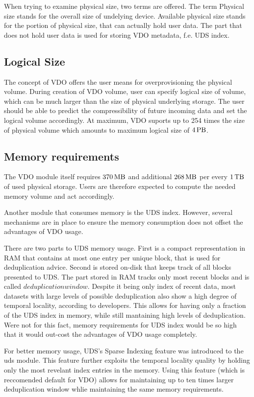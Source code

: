 \documentclass[
  color, %
  table, %
  lof,   %
  lot,   %
]{fithesis3}
\begin{document}
When trying to examine physical size, two terms are offered. The term Physical size stands for the overall size of undelying device. Available physical size stands for the portion of physical size, that can actually hold user data. The part that does not hold user data is used for storing VDO metadata, f.e. UDS index.

\subsection{Logical Size}
The concept of VDO offers the user means for overprovisioning the physical volume. During creation of VDO volume, user can specify logical size of volume, which can be much larger than the size of physical underlying storage. The user should be able to predict the compressibility of future incoming data and set the logical volume accordingly. At maximum, VDO suports up to 254 times the size of physical volume which amounts to maximum logical size of $\SI{4}{\peta\byte}$.

\subsection{Memory requirements}
The VDO module itself requires $\SI{370}{\mega\byte}$ and additional $\SI{268}{\mega\byte}$ per every $\SI{1}{\tera\byte}$ of used physical storage. Users are therefore expected to compute the needed memory volume and act accordingly.

Another module that consumes memory is the UDS index. However, several mechanisms are in place to ensure the memory consumption does not offset the advantages of VDO usage.

There are two parts to UDS memory usage. First is a compact representation in RAM that contains at most one entry per unique block, that is used for deduplication advice. Second is stored on-disk that keeps track of all blocks presented to UDS. The part stored in RAM tracks only most recent blocks and is called $deduplication window$. Despite it being only index of recent data, most datasets with large levels of possible deduplication also show a high degree of temporal locality, according to developers. This allows for having only a fraction of the UDS index in memory, while still mantaining high levels of deduplication. Were not for this fact, memory requirements for UDS index would be so high that it would out-cost the advantages of VDO usage completely.

For better memory usage, UDS's Sparse Indexing feature was introduced to the uds module. This feature further exploits the temporal locality quality by holding only the most revelant index entries in the memory. Using this feature (which is reccomended default for VDO) allows for maintaining up to ten times larger deduplication window whlie maintaining the same memory requirements.
\end{document}
